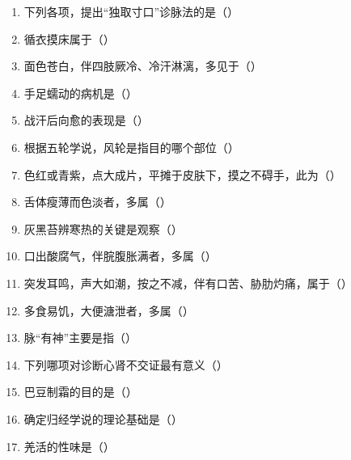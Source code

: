 \documentclass[a4paper,11pt]{ctexart}
\begin{document}
\begin{enumerate}
      \item 下列各项，提出“独取寸口”诊脉法的是（\quad）
      \item 循衣摸床属于（\quad）
      \item 面色苍白，伴四肢厥冷、冷汗淋漓，多见于（\quad）
      \item 手足蠕动的病机是（\quad）
      \item 战汗后向愈的表现是（\quad）
      \item 根据五轮学说，风轮是指目的哪个部位（\quad）
      \item 色红或青紫，点大成片，平摊于皮肤下，摸之不碍手，此为（\quad）
      \item 舌体瘦薄而色淡者，多属（\quad）
      \item 灰黑苔辨寒热的关键是观察（\quad）
      \item 口出酸腐气，伴脘腹胀满者，多属（\quad）
      \item 突发耳鸣，声大如潮，按之不减，伴有口苦、胁肋灼痛，属于（\quad）
      \item 多食易饥，大便溏泄者，多属（\quad）
      \item 脉“有神”主要是指（\quad）
      \item 下列哪项对诊断心肾不交证最有意义（\quad）
      \item 巴豆制霜的目的是（\quad）
      \item 确定归经学说的理论基础是（\quad）
      \item 羌活的性味是（\quad）

\end{enumerate}
\end{document}
